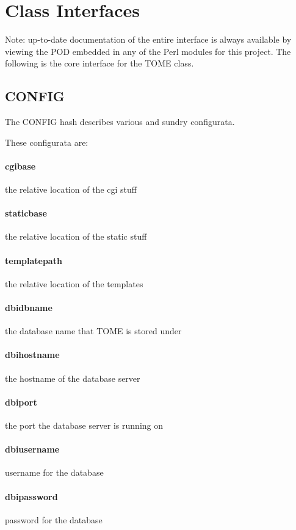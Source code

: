 \documentclass[12pt,titlepage]{article}
\begin{document}
\section{Class Interfaces}
Note: up-to-date documentation of the entire interface is always available by viewing the POD embedded in any of the Perl modules for this project.  The following is the core interface for the TOME class.

\subsection{CONFIG}
The CONFIG hash describes various and sundry configurata.

These configurata are:
\paragraph{cgibase}
the relative location of the cgi stuff 

\paragraph{staticbase}
the relative location of the static stuff 

\paragraph{templatepath}
the relative location of the templates 

\paragraph{dbidbname}
the database name that TOME is stored under 

\paragraph{dbihostname}
the hostname of the database server 

\paragraph{dbiport}
the port the database server is running on 

\paragraph{dbiusername}
username for the database 

\paragraph{dbipassword}
password for the database 
\end{document}
